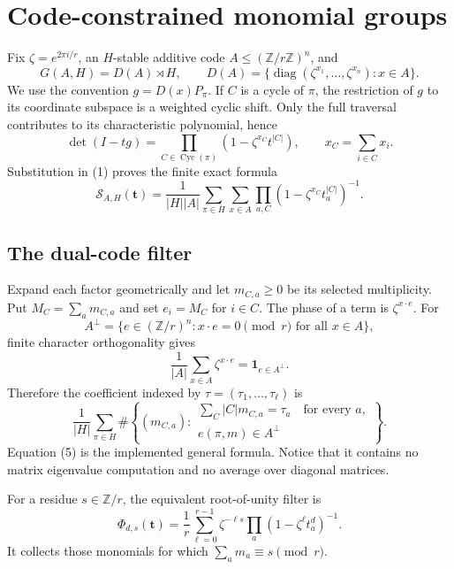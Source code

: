 \documentclass[11pt]{article}
\newcommand{\Sfun}{\mathcal S}
\newcommand{\Cyc}{\operatorname{Cyc}}
\begin{document}
\section{Code-constrained monomial groups}

Fix $\zeta=e^{2\pi i/r}$, an $H$-stable additive code
$A\leq(\mathbb Z/r\mathbb Z)^n$, and
\[
G(A,H)=D(A)\rtimes H,\qquad
D(A)=\{\operatorname{diag}(\zeta^{x_1},\ldots,\zeta^{x_n}):x\in A\}.
\]
We use the convention $g=D(x)P_\pi$.  If $C$ is a cycle of $\pi$, the
restriction of $g$ to its coordinate subspace is a weighted cyclic shift.
Only the full traversal contributes to its characteristic polynomial, hence
\begin{equation}
\det(I-tg)=\prod_{C\in\Cyc(\pi)}
\left(1-\zeta^{x_C}t^{|C|}\right),\qquad
x_C=\sum_{i\in C}x_i.                                         \tag{3}
\end{equation}
Substitution in (1) proves the finite exact formula
\begin{equation}
\Sfun_{A,H}(\mathbf t)=\frac1{|H||A|}
\sum_{\pi\in H}\sum_{x\in A}
\prod_{a,C}\left(1-\zeta^{x_C}t_a^{|C|}\right)^{-1}.         \tag{4}
\end{equation}

\subsection{The dual-code filter}

Expand each factor geometrically and let $m_{C,a}\geq0$ be its selected
multiplicity.  Put $M_C=\sum_am_{C,a}$ and set $e_i=M_C$ for $i\in C$.  The
phase of a term is $\zeta^{x\cdot e}$.  For
\[
A^\perp=\{e\in(\mathbb Z/r)^n:x\cdot e=0\pmod r\text{ for all }x\in A\},
\]
finite character orthogonality gives
\[
\frac1{|A|}\sum_{x\in A}\zeta^{x\cdot e}=\mathbf1_{e\in A^\perp}.
\]
Therefore the coefficient indexed by $\tau=(\tau_1,\ldots,\tau_\ell)$ is
\begin{equation}
\frac1{|H|}\sum_{\pi\in H}
\#\left\{(m_{C,a}):
\begin{array}{l}
\sum_C|C|m_{C,a}=\tau_a\quad\text{for every }a,\\
e(\pi,m)\in A^\perp
\end{array}\right\}.                                        \tag{5}
\end{equation}
Equation (5) is the implemented general formula.  Notice that it contains no
matrix eigenvalue computation and no average over diagonal matrices.

For a residue $s\in\mathbb Z/r$, the equivalent root-of-unity filter is
\[
\Phi_{d,s}(\mathbf t)=\frac1r\sum_{\ell=0}^{r-1}
\zeta^{-\ell s}\prod_a(1-\zeta^\ell t_a^d)^{-1}.
\]
It collects those monomials for which $\sum_am_a\equiv s\pmod r$.
\end{document}
